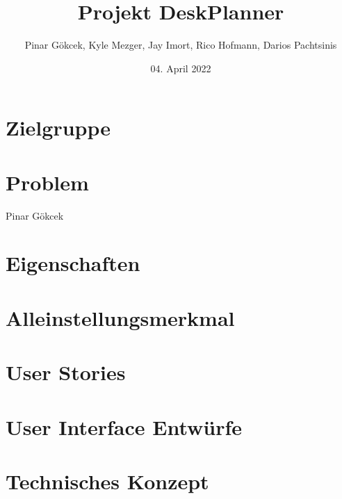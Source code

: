 \documentclass{article}
\title{Projekt DeskPlanner}
\author{Pinar Gökcek, Kyle Mezger, Jay Imort, Rico Hofmann, Darios Pachtsinis}
\date{04. April 2022}
\begin{document}
\begin{titlepage}
    \centering
    \maketitle

    \vfill

\end{titlepage}

\tableofcontents

\section{Zielgruppe}

\section{Problem}
Pinar Gökcek
\section{Eigenschaften}

\section{Alleinstellungsmerkmal}

\section{User Stories}

\section{User Interface Entwürfe}

\section{Technisches Konzept}

% 


\end{document}
